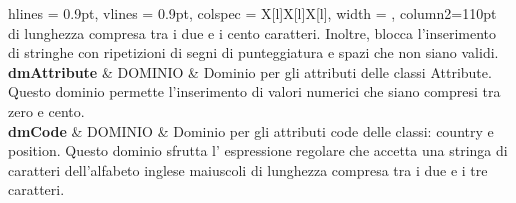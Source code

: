\begin{tblr}{
    hlines = {0.9pt}, vlines = {0.9pt}, colspec = {X[l]X[l]X[l]}, 
    width = \textwidth , column{2}={110pt}
}
{		di lunghezza compresa tra i due e i cento caratteri.
		Inoltre, blocca l'inserimento di stringhe
		con ripetizioni di segni di punteggiatura
		e spazi che non siano validi.
	}
	\\
	{
		\textbf{dmAttribute}
	}
	&
	{
		DOMINIO
	}
	&
	{
		Dominio per gli attributi delle classi Attribute.
		Questo dominio permette l'inserimento di
		valori numerici che siano compresi tra zero e cento.
	}
	\\
	{
		\textbf{dmCode}
	}
	&
	{
		DOMINIO
	}
	&
	{
		Dominio per gli attributi code delle classi:
		country e position.
		Questo dominio sfrutta l' espressione regolare
		che accetta una stringa di caratteri 
		dell'alfabeto inglese maiuscoli di 
		lunghezza compresa tra
		i due e i tre caratteri.
	}
	\\
\end{tblr}


\newpage


